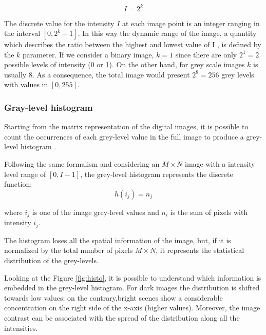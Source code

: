 \documentclass[../main.tex]{subfiles}
\begin{document}
\begin{equation}\label{equation_intensity_levels}
    I = 2^{k}
\end{equation}

The discrete value for the intensity $I$ at each image point is an integer ranging in the interval $[0,2^{k}-1]$. 
In this way the dynamic range of the image, a quantity which describes the ratio between the highest and lowest value of I \cite{dynamic_range}, is defined by the $k$ parameter. If we consider a binary image, $k=1$ since there are only $2^{1}=2$ possible levels of intensity (0 or 1). On the other hand, for grey scale images $k$ is usually 8. As a consequence, the total image would present $2^{8}=256$ grey levels with values in $[0,255]$.

\subsubsection{Gray-level histogram}

Starting from the matrix representation of the digital images, it is possible to count the occurrences of each grey-level value in the full image to produce a grey-level histogram \cite{fiete2010modeling}.  

Following the same formalism and considering an $M\times N$ image with a intensity level range of $[0, I-1]$, the grey-level histogram represents the discrete function:
\begin{equation}
    h(i_{j})=n_{j} 
\end{equation}

where $i_{j}$ is one of the image grey-level values and $n_{i}$ is the sum of pixels with intensity $i_{j}$.

The histogram loses all the spatial information of the image, but, if it is normalized by the total number of pixels $M\times N$, it represents the statistical distribution of the grey-levels. 

Looking at the Figure \ref{fig:histo}, it is possible to understand which information is embedded in the grey-level histogram. For dark images the distribution is shifted towards low values; on the contrary,bright scenes show a considerable concentration on the right side of the x-axis (higher values). Moreover, the image contrast can be associated with the spread of the distribution along all the intensities.
\end{document}
